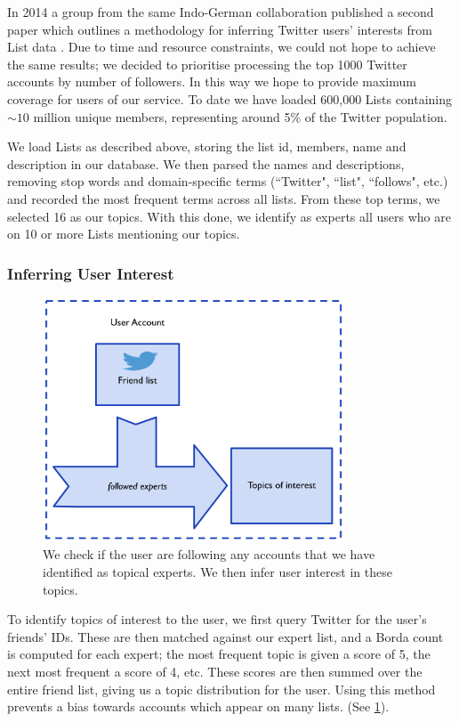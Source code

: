 \documentclass[11pt]{article}
\begin{document}
In 2014 a group from the same Indo-German collaboration published a second paper which outlines a methodology for inferring Twitter users' interests from List data \cite{infer_user_interest}. Due to time and resource constraints, we could not hope to achieve the same results; we decided to prioritise processing the top 1000 Twitter accounts by number of followers. In this way we hope to provide maximum coverage for users of our service. To date we have loaded 600,000 Lists containing \(\sim10\) million unique members, representing around 5\% of the Twitter population.

We load Lists as described above, storing the list id, members, name and description in our database. We then parsed the names and descriptions, removing stop words and domain-specific terms (``Twitter", ``list", ``follows", etc.) and recorded the most frequent terms across all lists. From these top terms, we selected 16 as our topics. With this done, we identify as experts all users who are on 10 or more Lists mentioning our topics. 

\subsubsection*{Inferring User Interest}

\begin{figure}[h]
\centering
	\includegraphics[width=0.8\textwidth]{./IMG/inferring_interest.PNG}
	\caption{We check if the user are following any accounts that we have identified as topical experts. We then infer user interest in these topics.}
	\label{user_interest}

\end{figure}

To identify topics of interest to the user, we first query Twitter for the user's friends' IDs. These are then matched against our expert list, and a Borda count is computed for each expert; the most frequent topic is given a score of 5, the next most frequent a score of 4, etc. These scores are then summed over the entire friend list, giving us a topic distribution for the user. Using this method prevents a bias towards accounts which appear on many lists. (See \cref{user_interest}).
\end{document}
